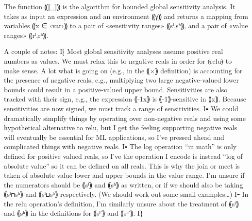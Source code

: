 \documentclass{article}
\begin{document}
The function ⸨⟦‗⟧⸩ is the algorithm for bounded global sensitivity analysis. It
takes as input an expression and an environment ⸨γ⸩ and returns a mapping from
variables ⸨x ∈ ‹var›⸩ to a pair of «sensitivity ranges» ⸨sˡ,sʰ⸩, and a pair of
«value ranges» ⸨rˡ,rʰ⸩.

A couple of notes:
I⁅ Most global sensitivity analyses assume positive real numbers as values. We
   must relax this to negative reals in order for ⦑relu⦒ to make sense. A lot
   what is going on (e.g., in the ⸨×⸩ definition) is accounting for the presence
   of negative reals, e.g., multiplying two large negative-valued lower bounds
   could result in a positive-valued upper bound. Sensitivities are also tracked
   with their sign, e.g., the expression ⸨-1x⸩ is ⸨-1⸩-sensitive in ⸨x⸩. Because
   sensitivities are now signed, we must track a range of sensitivities.
I⁃ We could dramatically simplify things by operating over non-negative reals
   and using some hypothetical alternative to relu, but I get the feeling
   supporting negative reals will eventually be essential for ML applications,
   so I've pressed ahead and complicated things with negative reals.
I⁃ The log operation “in math” is only defined for positive valued reals, so
   I've the operation I encode is instead “log of absolute value” so it can be
   defined on all reals. This is why the join or meet is taken of absolute value
   lower and upper bounds in the value range. I'm unsure if the numerators
   should be ⸨sˡ⸩ and ⸨sʰ⸩ as written, or if we should also be taking ⸨sˡ⊓sʰ⸩
   and ⸨sˡ⊔sʰ⸩ respectively. (We should work out some small examples…)
I⁃ In the relu operation's definition, I'm similarly unsure about the treatment
   of ⸨sˡ⸩ and ⸨sʰ⸩ in the definitions for ⸨sˡ′⸩ and ⸨sʰ′⸩.
I⁆
\end{document}

